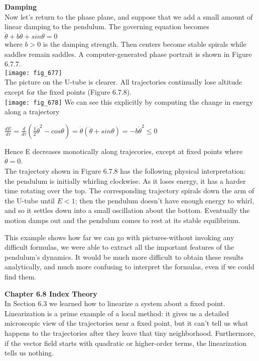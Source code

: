 \documentclass{article}
\newcommand\tab[1][1cm]{\hspace*{#1}}
\begin{document}
\textbf{Damping}
\\ \tab Now let's return to the phase plane, and suppose that we add a small amount of linear damping to the pendulum. The governing equation becomes \\ \tab
$\ddot{\theta}+b\dot{\theta}+sin\theta = 0$ \\
where $b>0$ is the damping strength. Then centers become stable spirals while saddles remain saddles. A computer-generated phase portrait is shown in Figure 6.7.7. \\
\texttt{[image: fig\_677]} \\ \tab
The picture on the U-tube is clearer. All trajectories continually lose altitude except for the fixed points (Figure 6.7.8). \\
\texttt{[image: fig\_678]} 
We can see this explicitly by computing the change in energy along a trajectory
\begin{center}
$\frac{dE}{d\tau}=\frac{d}{d\tau}(\frac{1}{2}\dot{\theta}^{2}-cos\theta)= \dot{\theta}(\ddot{\theta}+sin\theta)=-b\dot{\theta}^{2} \leq 0$
\end{center}
Hence E decreases monotically along trajecories, except at fixed points where $\dot{\theta}=0$. \\ \tab
The trajectory shown in Figure 6.7.8 has the following physical interpretation: the pendulum is initially whirling clockwise. As it loses energy, it has a harder time rotating over the top. The corresponding trajectory spirals down the arm of the U-tube until $E<1$; then the pendulum doesn't have enough energy to whirl, and so it settles down into a small oscillation about the bottom. Eventually the motion damps out and the pendulum comes to rest at its stable equilibrium. \\ \tab

This example shows how far we can go with pictures-without invoking any difficult formulas, we were able to extract all the important features of the pendulum's dynamics. It would be much more difficult to obtain these results analytically, and much more confusing to interpret the formulas, even if we could find them. 

\textbf {Chapter 6.8 Index Theory} \\ 
In Section 6.3 we learned how to linearize a system about a fixed point. Linearization is a prime example of a local method: it gives us a detailed microscopic view of the trajectories near a fixed point, but it can't tell us what happens to the trajectories after they leave that tiny neighborhood. Furthermore, if the vector field starts with quadratic or higher-order terms, the linearization tells us nothing. \\ \tab
\end{document}
